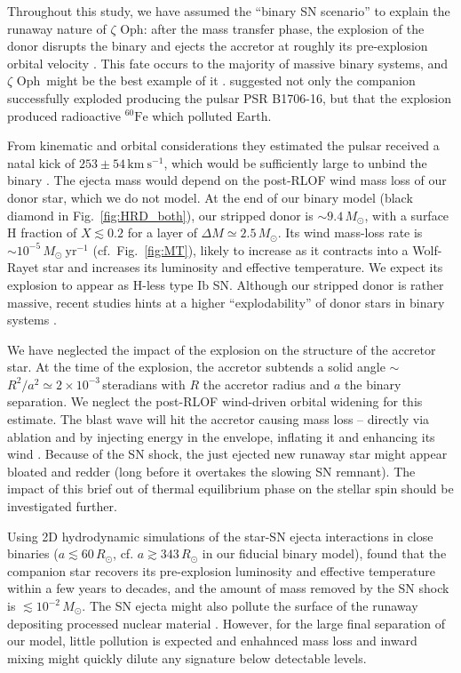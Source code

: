 \documentclass[twocolumn,twocolappendix,trackchanges]{aastex63}
\newcommand{\kms}{{\mathrm{km\ s^{-1}}}}
\DeclareRobustCommand{\Figref}[1]{Fig.~\ref{#1}}
\newcommand{\zoph}{$\zeta$ Oph}
\begin{document}
Throughout this study, we have assumed the ``binary SN scenario'' to
explain the runaway nature of \zoph:
after the mass transfer phase, the explosion of the donor disrupts the
binary and ejects the accretor at roughly its pre-explosion orbital
velocity \citep[e.g.,][]{renzo:19walk}. This fate occurs to the
majority of massive binary systems, and \zoph\ might be the best
example of it \citep[e.g.,][]{blaauw:52, blaauw:61,
  hoogerwerf:00}. \cite{neuhauser:20} suggested not only the companion
successfully exploded producing the pulsar PSR B1706-16, but that the
explosion produced radioactive $^{60}\mathrm{Fe}$ which polluted
Earth.

From kinematic and orbital considerations they estimated the pulsar
received a natal kick of
$253\pm54\,\kms$, which would be sufficiently large to unbind the binary \citep{kalogera:96, tauris:15}.  The ejecta mass would depend on the post-RLOF wind mass loss of our donor star, which we do not model.  At the end of our binary model (black diamond in \Figref{fig:HRD_both}), our stripped donor is
$\sim$$9.4\,M_\odot$, with a surface H fraction of $X\lesssim0.2$ for
a layer of $\Delta M \simeq 2.5\,M_\odot$.  Its wind mass-loss rate is
$\sim10^{-5}\,M_\odot \ \mathrm{yr^{-1}}$ (cf.~\Figref{fig:MT}),
likely to increase as it contracts into a Wolf-Rayet star and
increases its luminosity and effective temperature. We expect its
explosion to appear as H-less type Ib SN. Although our stripped donor
is rather massive, recent studies hints at a higher ``explodability''
of donor stars in binary systems \citep[e.g.,][]{schneider:21,
  laplace:21, vartanyan:21}.

We have neglected the impact of the explosion on the structure of the
accretor star. At the time of the explosion, the accretor subtends a
solid angle $\sim$$R^2/a^2\simeq
2\times10^{-3}$\,steradians with $R$ the accretor radius and
$a$ the binary separation. We neglect the post-RLOF wind-driven orbital widening for this estimate.  The blast wave will hit the accretor causing mass loss -- directly via ablation and by injecting energy in the envelope, inflating it and enhancing its wind \citep{wheeler:75, tauris:98, podsiadlowski:03, hirai:18}.  Because of the SN shock, the just ejected new runaway star might appear bloated and redder (long before it overtakes the slowing SN remnant). The impact of this brief out of thermal equilibrium phase on the stellar spin should be investigated further.

Using 2D hydrodynamic simulations of the star-SN ejecta interactions in close binaries ($a\lesssim
60\,R_\odot$, cf. $a\gtrsim
343\,R_\odot$ in our fiducial binary model), \cite{hirai:18} found that the companion star recovers its pre-explosion luminosity and effective temperature within a few years to decades, and the amount of mass removed by the SN shock is
$\lesssim10^{-2}\,M_\odot$.  The SN ejecta might also pollute the surface of the runaway depositing processed nuclear material \citep[e.g.,][]{przybilla:08, suda:21}. However, for the large final separation of our model, little pollution is expected and enhahnced mass loss and inward mixing might quickly dilute any signature below detectable levels.
\end{document}
